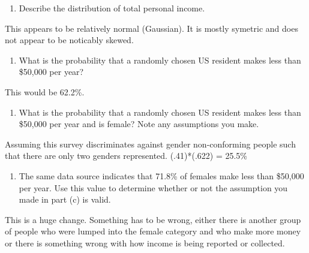 \documentclass[]{article}
\providecommand{\tightlist}{%
  \setlength{\itemsep}{0pt}\setlength{\parskip}{0pt}}
\begin{document}
\begin{enumerate}
\def\labelenumi{(\alph{enumi})}
\tightlist
\item
  Describe the distribution of total personal income.
\end{enumerate}

This appears to be relatively normal (Gaussian). It is mostly symetric
and does not appear to be noticably skewed.

\begin{enumerate}
\def\labelenumi{(\alph{enumi})}
\setcounter{enumi}{1}
\tightlist
\item
  What is the probability that a randomly chosen US resident makes less
  than \$50,000 per year?
\end{enumerate}

This would be 62.2\%.

\begin{enumerate}
\def\labelenumi{(\alph{enumi})}
\setcounter{enumi}{2}
\tightlist
\item
  What is the probability that a randomly chosen US resident makes less
  than \$50,000 per year and is female? Note any assumptions you make.
\end{enumerate}

Assuming this survey discriminates against gender non-conforming people
such that there are only two genders represented. (.41)*(.622) = 25.5\%

\begin{enumerate}
\def\labelenumi{(\alph{enumi})}
\setcounter{enumi}{3}
\tightlist
\item
  The same data source indicates that 71.8\% of females make less than
  \$50,000 per year. Use this value to determine whether or not the
  assumption you made in part (c) is valid.
\end{enumerate}

This is a huge change. Something has to be wrong, either there is
another group of people who were lumped into the female category and who
make more money or there is something wrong with how income is being
reported or collected.
\end{document}
